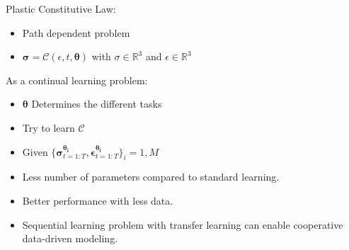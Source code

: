 \documentclass[a0paper,portrait]{baposter}
\begin{document}
\begin{poster}
{
  Plastic Constitutive Law:
  \begin{itemize}
    \item Path dependent problem
    \item $\boldsymbol{\sigma}=\mathcal{C}(\epsilon, t, \boldsymbol{\theta})$ with $\sigma\in\mathbb{R}^3$ and $\epsilon\in\mathbb{R}^3$
  \end{itemize}
  As a continual learning problem:
  \begin{itemize}
    \item $\boldsymbol{\theta}$ Determines the different tasks
    \item Try to learn $\mathcal{C}$
    \item Given $\{\boldsymbol{\sigma}^{\boldsymbol{\theta_i}}_{t=1:T},\boldsymbol{\epsilon}^{\boldsymbol{\theta_i}}_{t=1:T}\}_i=1,M$
  \end{itemize}
}
{
  \centering
  \begin{itemize}
    \item Less number of parameters compared to standard learning.
    \item Better performance with less data.
    \item Sequential learning problem with transfer learning can enable cooperative data-driven modeling.
  \end{itemize}
}
{
\renewcommand{\section}[2]{\vskip 0.05em} %
  
\small   

}
%
\end{poster}
\end{document}
